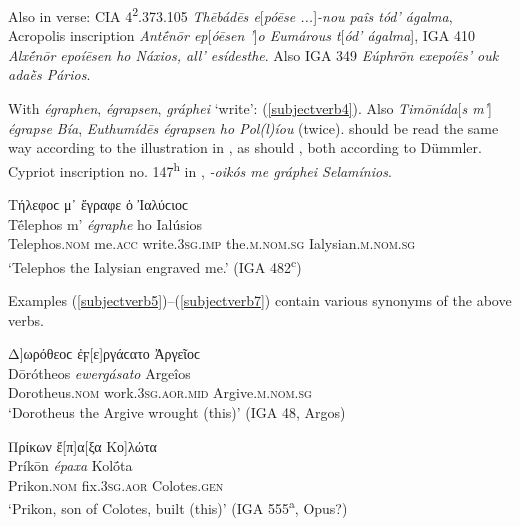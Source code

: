 Also in verse: CIA 4\textsuperscript{2}.373.105 \textit{Thēbádēs \emph{e}}{[}\textit{\emph{póēse} ...}{]}\textit{-nou paîs tód' ágalma}, Acropolis inscription \citep[135ff.]{Studniczka1887} \textit{Antḗnōr \emph{ep}}{[}\textit{\emph{óēsen} '}{]}\textit{o Eumárous t}{[}\textit{ód' ágal\-ma}{]}, IGA 410 \textit{Alxḗnōr \emph{epoíēsen} ho Náxios, all' esídesthe}. Also IGA 349 \textit{Eúphrōn \emph{exepoíēs'} ouk adaḕs Pários}.

With \textit{égraphen}, \textit{égrapsen}, \textit{gráphei} `write': (\ref{subjectverb4}). Also \citet[29]{Klein1887} \textit{Timōní\-da}{[}\textit{s m'}{]} \textit{\emph{égrapse} Bía}, \citet[196.7]{Klein1887} \textit{Euthumídēs \emph{égrapsen} ho Pol(l)íou} (twice). \citet[194.2]{Klein1887} should be read the same way according to the illustration in \citet[Figure 188]{Gerhard1847}, as should \citet[195]{Klein1887}, both according to Dümmler.\label{kleinx2} Cypriot inscription no. 147\textsuperscript{h} in \citet[148]{Meister1889}, \textit{-oikós me \emph{gráphei} Selamínios}.

\begin{exe}
\ex Τήλεφοϲ μ᾽ ἔγραφε ὁ Ἰαλύϲιοϲ\\
\gll Tḗlephos m' \emph{égraphe} ho Ialúsios\\
Telephos.\textsc{nom} me.\textsc{acc} write.\textsc{3sg.imp} the.\textsc{m.nom.sg} Ialysian.\textsc{m.nom.sg}\\
\trans `Telephos the Ialysian engraved me.' (IGA 482\textsuperscript{c}) 
\label{subjectverb4}
\end{exe}

Examples (\ref{subjectverb5})--(\ref{subjectverb7}) contain various synonyms of the above verbs.

\begin{exe}
\ex {[}Δ{]}ωρόθεοϲ ἐϝ{[}ε{]}ργάϲατο Ἀργεῖοϲ\\
\gll Dōrótheos \emph{ewergásato} Argeîos\\
Dorotheus.\textsc{nom} work.\textsc{3sg.aor.mid} Argive.\textsc{m.nom.sg}\\
\trans `Dorotheus the Argive wrought (this)' (IGA 48, Argos) 
\label{subjectverb5}
\end{exe}

\begin{exe}
\ex Πρίκων ἔ{[}π{]}α{[}ξα Κο{]}λώτα\\
\gll Príkōn \emph{épaxa} Kolṓta\\
Prikon.\textsc{nom} fix.\textsc{3sg.aor} Colotes.\textsc{gen}\\
\trans `Prikon, son of Colotes, built (this)' (IGA 555\textsuperscript{a}, Opus?) 
\label{subjectverb6}
\end{exe}

